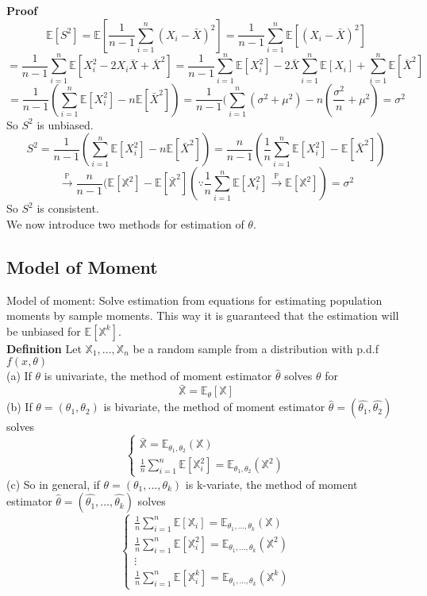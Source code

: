 \textbf{Proof} 
$$\mathbb{E}[S^2] = \mathbb{E}[ \frac{1}{n-1}\sum_{i=1}^n (X_i-\bar{X})^2 ] = \frac{1}{n-1}\sum_{i=1}^n\mathbb{E}[ (X_i-\bar{X})^2 ]$$
$$= \frac{1}{n-1}\sum_{i=1}^n\mathbb{E}[ X_i^2-2X_i\bar{X}+\bar{X}^2 ] = \frac{1}{n-1}\sum_{i=1}^n\mathbb{E}[ X_i^2 ] -2\bar{X}\sum_{i=1}^n\mathbb{E}[X_i]+\sum_{i=1}^n\mathbb{E}[\bar{X}^2 ]$$
$$= \frac{1}{n-1}(\sum_{i=1}^n\mathbb{E}[ X_i^2] - n\mathbb{E}[\bar{X}^2]) = \frac{1}{n-1}(\sum_{i=1}^n (\sigma^2 + \mu^2) - n(\frac{\sigma^2}{n} + \mu^2) = \sigma^2$$
So $S^2$ is unbiased.
$$S^2 = \frac{1}{n-1}(\sum_{i=1}^n\mathbb{E}[ X_i^2] - n\mathbb{E}[\bar{X}^2]) = \frac{n}{n-1}(\frac{1}{n}\sum_{i=1}^n\mathbb{E}[ X_i^2] - \mathbb{E}[\bar{X}^2])$$
$$\overset{\mathbb{P}}{\to} \frac{n}{n-1} ( \mathbb{E}[\mathbb{X}^2] - \mathbb{E}[\bar{\mathbb{X}}^2] (\because \frac{1}{n}\sum_{i=1}^n\mathbb{E}[ X_i^2] \overset{\mathbb{P}}{\to} \mathbb{E}[\mathbb{X}^2]) = \sigma^2$$
So $S^2$ is consistent.\\

We now introduce two methods for estimation of $\theta$.\\

\subsection{Model of Moment}
Model of moment: Solve estimation from equations for estimating population moments by sample moments. This way it is guaranteed that the estimation will be unbiased for $\mathbb{E}[\mathbb{X}^k]$.\\

\textbf{Definition} Let $\mathbb{X}_1, ..., \mathbb{X}_n$ be a random sample from a distribution with p.d.f $f(x, \theta)$\\
(a) If $\theta$ is univariate, the method of moment estimator $\hat{\theta}$ solves $\theta$ for $$\bar{\mathbb{X}} = \mathbb{E}_\theta[\mathbb{X}]$$
(b) If $\theta = (\theta_1, \theta_2)$ is bivariate, the method of moment estimator $\hat{\theta} = (\hat{\theta_1}, \hat{\theta_2})$ solves
$$\begin{cases}
\bar{\mathbb{X}} = \mathbb{E}_{\theta_1, \theta_2}(\mathbb{X})\\
\frac{1}{n}\sum_{i=1}^n\mathbb{E}[ \mathbb{X}_i^2] = \mathbb{E}_{\theta_1, \theta_2}(\mathbb{X}^2)
\end{cases}
$$
(c) So in general, if $\theta = (\theta_1, ..., \theta_k)$ is k-variate, the method of moment estimator $\hat{\theta} = (\hat{\theta_1}, ..., \hat{\theta_k})$ solves
$$\begin{cases}
\frac{1}{n}\sum_{i=1}^n\mathbb{E}[ \mathbb{X}_i] = \mathbb{E}_{\theta_1, ...,  \theta_k}(\mathbb{X})\\
\frac{1}{n}\sum_{i=1}^n\mathbb{E}[ \mathbb{X}_i^2] = \mathbb{E}_{\theta_1, ..., \theta_k}(\mathbb{X}^2)\\
\vdots\\
\frac{1}{n}\sum_{i=1}^n\mathbb{E}[ \mathbb{X}_i^k] = \mathbb{E}_{\theta_1, ..., \theta_k}(\mathbb{X}^k)
\end{cases}$$

